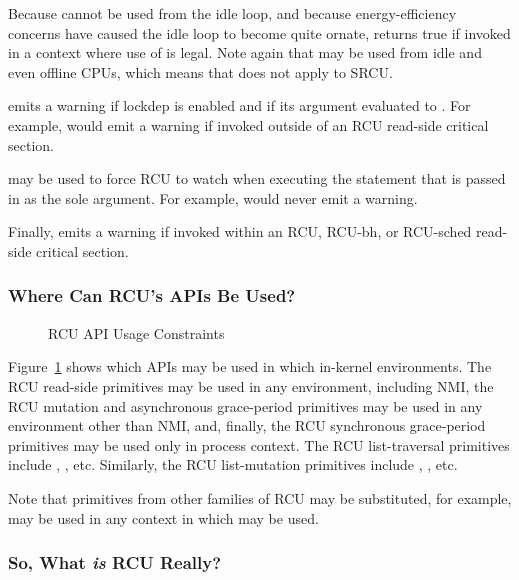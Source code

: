 Because  cannot be used from the idle loop,
and because energy-efficiency concerns have caused the idle loop
to become quite ornate,  returns true if
invoked in a context where use of  is legal.
Note again that  may be used from idle and
even offline CPUs, which means that  does not
apply to SRCU.

 emits a warning if lockdep is enabled and if
its argument evaluated to .
For example,  would emit a
warning if invoked outside of an RCU read-side critical section.

 may be used to force RCU to watch when executing
the statement that is passed in as the sole argument.
For example, 
would never emit a warning.

Finally,   emits a warning if invoked within
an RCU, RCU-bh, or RCU-sched read-side critical section.

\subsubsection{Where Can RCU's APIs Be Used?}
\label{sec:defer:Where Can RCU's APIs Be Used?}

\begin{figure}[tb]
\centering
{}
\caption{RCU API Usage Constraints}
\label{fig:defer:RCU API Usage Constraints}
\end{figure}

Figure~\ref{fig:defer:RCU API Usage Constraints}
shows which APIs may be used in which in-kernel environments.
The RCU read-side primitives may be used in any environment, including NMI,
the RCU mutation and asynchronous grace-period primitives may be used in any
environment other than NMI, and, finally, the RCU synchronous grace-period
primitives may be used only in process context.
The RCU list-traversal primitives include ,
, etc.
Similarly, the RCU list-mutation primitives include
, , etc.

Note that primitives from other families of RCU may be substituted,
for example,  may be used in any context
in which  may be used.

\subsubsection{So, What \emph{is} RCU Really?}
\label{sec:defer:So, What is RCU Really?}

